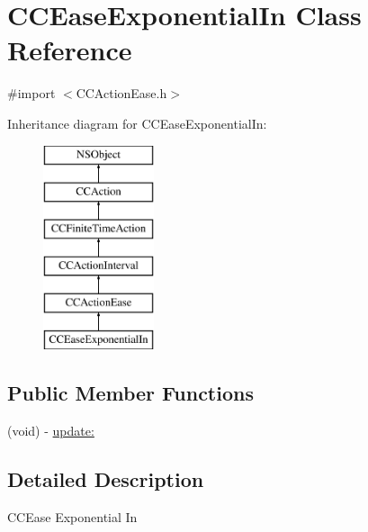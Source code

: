 \hypertarget{interface_c_c_ease_exponential_in}{\section{C\-C\-Ease\-Exponential\-In Class Reference}
\label{interface_c_c_ease_exponential_in}
}


{\ttfamily \#import $<$C\-C\-Action\-Ease.\-h$>$}

Inheritance diagram for C\-C\-Ease\-Exponential\-In\-:\begin{figure}[H]
\begin{center}
\leavevmode
\includegraphics[height=6.000000cm]{interface_c_c_ease_exponential_in}
\end{center}
\end{figure}
\subsection*{Public Member Functions}
\begin{DoxyCompactItemize}
\item 
(void) -\/ \hyperlink{interface_c_c_ease_exponential_in_af3bc4d09bcd537868b53a33ee1bfc342}{update\-:}
\end{DoxyCompactItemize}


\subsection{Detailed Description}
C\-C\-Ease Exponential In 

